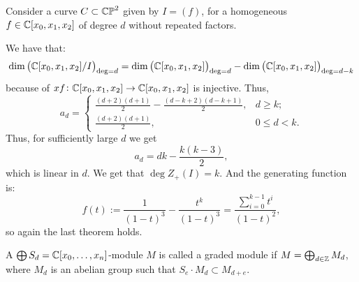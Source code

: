 \documentclass[11pt,a4paper]{article}
\begin{document}
\begin{example}
  Consider a curve $C \subset \mathbb{CP}^2$ given by $I = (f)$,
  for a homogeneous $f \in \mathbb{C}[x_0,x_1,x_2]$ of degree $d$ without repeated
  factors.

  We have that:
  \[
    \dim\left( \mathbb{C}[x_0,x_1,x_2] / I\right)_{\deg = d} =
    \dim\left( \mathbb{C}[x_0,x_1,x_2]\right)_{\deg = d} -
    \dim\left( \mathbb{C}[x_0,x_1,x_2]\right)_{\deg = d - k}
  \]
  because of $xf \colon \mathbb{C}[x_0,x_1,x_2] \to \mathbb{C}[x_0,x_1,x_2]$ is injective.
  Thus,
  \[
    a_d =
    \begin{cases}
      \frac{(d + 2)(d + 1)}{2} - \frac{(d - k + 2)(d - k + 1)}{2}, & d \geq k; \\
      \frac{(d + 2)(d + 1)}{2}, & 0 \le d < k.
    \end{cases}
  \]
  Thus, for sufficiently large $d$ we get
  \[
    a_d = dk - \frac{k (k - 3)}{2},
  \]
  which is linear in $d$.
  We get that $\deg Z_+(I) = k$.
  And the generating function is:
  \[
    f(t) := \frac{1}{(1 - t)^3} - \frac{t^k}{(1 - t)^3} =
    \frac{\sum_{i=0}^{k-1} t^i}{(1 - t)^2},
  \]
  so again the last theorem holds.
\end{example}


\begin{definition}
  A $\bigoplus S_d = \mathbb{C}[x_0,\dots,x_n]$-module $M$ is called a graded module
  if $M = \bigoplus_{d \in \mathbb{Z}} M_d$,
  where $M_d$ is an abelian group such that $S_e \cdot M_d \subset M_{d + e}$.
\end{definition}
\end{document}
